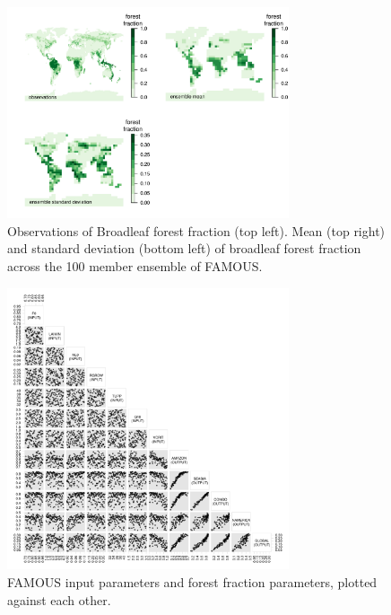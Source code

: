\documentclass[esd, article]{copernicus} %
\begin{document}

\begin{figure}[t]
\includegraphics[width=8.3cm]{graphics/BL_obs_ensemble_mean_sd.pdf}
\caption{Observations of Broadleaf forest fraction (top left). Mean (top right) and standard deviation (bottom left) of broadleaf forest fraction across the 100 member ensemble of FAMOUS.}
\label{fig:BL_obs_ensemble_mean_sd}
\end{figure}

\begin{figure}[t]
\includegraphics[width=8.3cm]{graphics/frac_pairs.pdf}
\caption{FAMOUS input parameters and forest fraction parameters, plotted against each other.}
\label{fig:frac_pairs}
\end{figure}
\end{document}

